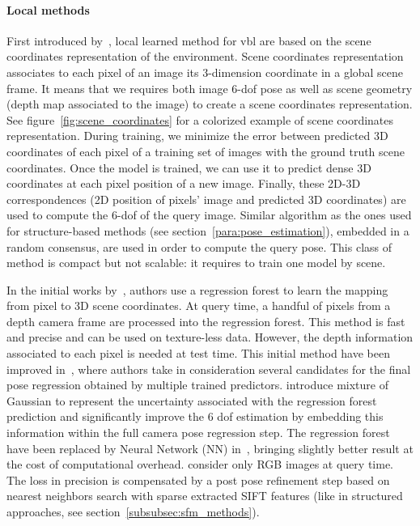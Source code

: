 \paragraph{Local methods}

First introduced by~\citet{Shotton2013}, local learned method for \ac{vbl} are based on the scene coordinates representation of the environment. Scene coordinates representation associates to each pixel of an image its 3-dimension coordinate in a global scene frame. It means that we requires both image 6-\ac{dof} pose as well as scene geometry (\eg depth map associated to the image) to create a scene coordinates representation. See figure~\ref{fig:scene_coordinates} for a colorized example of scene coordinates representation. During training, we minimize the error between predicted 3D coordinates of each pixel of a training set of images with the ground truth scene coordinates. Once the model is trained, we can use it to predict dense 3D coordinates at each pixel position of a new image. Finally, these 2D-3D correspondences (2D position of pixels' image and predicted 3D coordinates) are used to compute the 6-\ac{dof} of the query image. Similar algorithm as the ones used for structure-based methods (see section~\ref{para:pose_estimation}), embedded in a random consensus, are used in order to compute the query pose. This class of method is compact but not scalable: it requires to train one model by scene.

In the initial works by~\citet{Shotton2013}, authors use a regression forest to learn the mapping from pixel to 3D scene coordinates. At query time, a handful of pixels from a depth camera frame are processed into the regression forest. This method is fast and precise and can be used on texture-less data. However, the depth information associated to each pixel is needed at test time. This initial method have been improved in~\citep{Guzman-rivera2014}, where authors take in consideration several candidates for the final pose regression obtained by multiple trained predictors. \citet{Valentin2015} introduce mixture of Gaussian to represent the uncertainty associated with the regression forest prediction and significantly improve the 6 \ac{dof} estimation by embedding this information within the full camera pose regression step. The regression forest have been replaced by Neural Network (NN) in~\citep{Massiceti2016}, bringing slightly better result at the cost of computational overhead. \citet{Meng2016} consider only RGB images at query time. The loss in precision is compensated by a post pose refinement step based on nearest neighbors search with sparse extracted SIFT features (like in structured approaches, see section~\ref{subsubsec:sfm_methods}).

